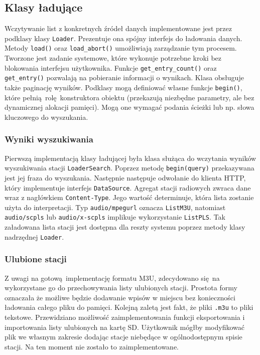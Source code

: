 \documentclass[12pt]{report}
\begin{document}
			
		\subsection{Klasy ładujące}
			Wczytywanie list z konkretnych źródeł danych implementowane jest przez podklasy klasy \lstinline|Loader|. Prezentuje ona spójny interfejs do ładowania danych. Metody \lstinline|load()| oraz \lstinline|load_abort()| umożliwiają zarządzanie tym procesem. Tworzone jest zadanie systemowe, które wykonuje potrzebne kroki bez blokowania interfejsu użytkownika. Funkcje \lstinline|get_entry_count()| oraz \lstinline|get_entry()| pozwalają na pobieranie informacji o wynikach. Klasa obsługuje także paginację wyników. Podklasy mogą definiować własne funkcje \lstinline|begin()|, które pełnią rolę konstruktora obiektu (przekazują niezbędne parametry, ale bez dynamicznej alokacji pamięci). Mogą one wymagać podania ścieżki lub np. słowa kluczowego do wyszukania.
			
			\subsubsection{Wyniki wyszukiwania}
				Pierwszą implementacją klasy ładującej była klasa służąca do wczytania wyników wyszukiwania stacji \lstinline|LoaderSearch|. Poprzez metodę \lstinline|begin(query)| przekazywana jest jej fraza do wyszukania. Następnie następuje odwołanie do klienta HTTP, który implementuje interfejs \lstinline|DataSource|. Agregat stacji radiowych zwraca dane wraz z nagłówkiem \lstinline|Content-Type|. Jego wartość determinuje, która lista zostanie użyta do interpretacji. Typ \lstinline|audio/mpegurl| oznacza \lstinline|ListM3U|, natomiast \lstinline|audio/scpls| lub \lstinline|audio/x-scpls| implikuje wykorzystanie \lstinline|ListPLS|. Tak załadowana lista stacji jest dostępna dla reszty systemu poprzez metody klasy nadrzędnej \lstinline|Loader|.
			
			\subsubsection{Ulubione stacji}
				Z uwagi na gotową implementację formatu M3U, zdecydowano się na wykorzystane go do przechowywania listy ulubionych stacji. Prostota formy oznaczała że możliwe będzie dodawanie wpisów w miejscu bez konieczności ładowania całego pliku do pamięci. Kolejną zaletą jest fakt, że pliki \lstinline|.m3u| to pliki tekstowe. Przewidziano możliwość zaimplementowania funkcji eksportowania i importowania listy ulubionych na kartę SD. Użytkownik mógłby modyfikować plik we własnym zakresie dodając stacje niebędące w ogólnodostępnym spisie stacji. Na ten moment nie zostało to zaimplementowane.
\end{document}
